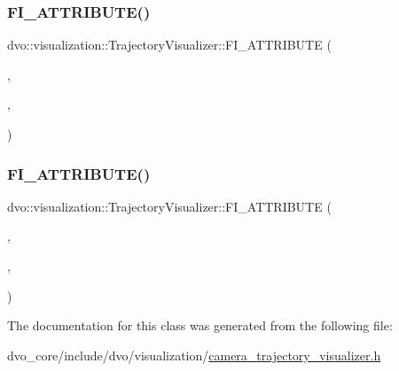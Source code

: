 \subsubsection{\texorpdfstring{F\+I\+\_\+\+A\+T\+T\+R\+I\+B\+U\+T\+E()}{FI\_ATTRIBUTE()}\hspace{0.1cm}{\footnotesize\ttfamily [1/2]}}
{\footnotesize\ttfamily dvo\+::visualization\+::\+Trajectory\+Visualizer\+::\+F\+I\+\_\+\+A\+T\+T\+R\+I\+B\+U\+TE (\begin{DoxyParamCaption}\item[{\mbox{\hyperlink{classdvo_1_1visualization_1_1_trajectory_visualizer}{Trajectory\+Visualizer}}}]{,  }\item[{std\+::string}]{,  }\item[{name}]{ }\end{DoxyParamCaption})}

\mbox{\label{classdvo_1_1visualization_1_1_trajectory_visualizer_a023390bc025a00c0e08da2b91a7a2aec}} 
\subsubsection{\texorpdfstring{F\+I\+\_\+\+A\+T\+T\+R\+I\+B\+U\+T\+E()}{FI\_ATTRIBUTE()}\hspace{0.1cm}{\footnotesize\ttfamily [2/2]}}
{\footnotesize\ttfamily dvo\+::visualization\+::\+Trajectory\+Visualizer\+::\+F\+I\+\_\+\+A\+T\+T\+R\+I\+B\+U\+TE (\begin{DoxyParamCaption}\item[{\mbox{\hyperlink{classdvo_1_1visualization_1_1_trajectory_visualizer}{Trajectory\+Visualizer}}}]{,  }\item[{\mbox{\hyperlink{structdvo_1_1visualization_1_1_color}{Color}}}]{,  }\item[{color}]{ }\end{DoxyParamCaption})}



The documentation for this class was generated from the following file\+:\begin{DoxyCompactItemize}
\item 
dvo\+\_\+core/include/dvo/visualization/\mbox{\hyperlink{camera__trajectory__visualizer_8h}{camera\+\_\+trajectory\+\_\+visualizer.\+h}}\end{DoxyCompactItemize}
